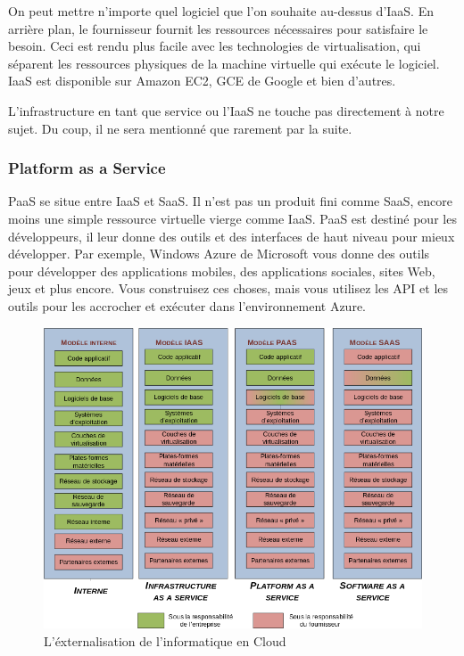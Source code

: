 \begin{onehalfspace}
On peut mettre n'importe quel logiciel que l'on souhaite au-dessus d'IaaS. En arrière plan, le fournisseur fournit les ressources nécessaires pour satisfaire le besoin. Ceci est rendu plus facile avec les technologies de virtualisation, qui séparent les ressources physiques de la machine virtuelle qui exécute le logiciel. IaaS est disponible sur Amazon EC2, GCE de Google et bien d'autres.

L'infrastructure en tant que service ou l'IaaS ne touche pas directement à notre sujet. Du coup, il ne sera mentionné que rarement par la suite.

\subsubsection*{Platform as a Service}

PaaS se situe entre IaaS et SaaS. Il n'est pas un produit fini comme SaaS, encore moins une simple ressource virtuelle vierge comme IaaS. PaaS est destiné pour les développeurs, il leur donne des outils et des interfaces de haut niveau pour mieux développer. Par exemple, Windows Azure de Microsoft vous donne des outils pour développer des applications mobiles, des applications sociales, sites Web, jeux et plus encore. Vous construisez ces choses, mais vous utilisez les API et les outils pour les accrocher et exécuter dans l'environnement Azure.


\begin{figure}[H]
\centering
\includegraphics [scale=0.5]{chapitre2/assets/cloud-vs.png}
\caption{L'éxternalisation de l'informatique en Cloud}
\end{figure}



\end{onehalfspace}
